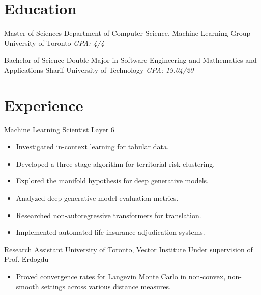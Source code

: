 \documentclass[11pt,a4paper,sans]{moderncv}
\begin{document}
\makecvtitle
\section{Education}

{Master of Sciences}
{Department of Computer Science, Machine Learning Group}
{University of Toronto}
{}
{\textit{GPA: 4/4}}

{Bachelor of Science}
{Double Major in Software Engineering and Mathematics and Applications}
{Sharif University of Technology}
{}
{\textit{GPA: 19.04/20}}


\section{Experience}
{Machine Learning Scientist}
{Layer 6}
{}{}{
  \begin{itemize}
    \item Investigated in-context learning for tabular data.
    \item Developed a three-stage algorithm for territorial risk clustering.
    \item Explored the manifold hypothesis for deep generative models.
    \item Analyzed deep generative model evaluation metrics.
    \item Researched non-autoregressive transformers for translation.
    \item Implemented automated life insurance adjudication systems.
  \end{itemize}
}

{Research Assistant}
{University of Toronto, Vector Institute}
{}
{Under supervision of Prof. Erdogdu}{
  \begin{itemize}
    \item Proved convergence rates for Langevin Monte Carlo in non-convex,
      non-smooth settings across various distance measures.
  \end{itemize}
}


\nocite{*}

{\small

}

%
%
%
\end{document}
